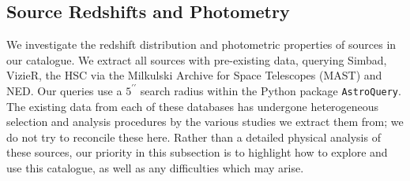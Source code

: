 {\begin{table}
\centering
\caption{A breakdown of gems found in the visual inspection stage of contamination. Each gem category has been classified based on the references associated with each object.} 
\label{tab:gems}
\end{table}


\vspace{-5mm}

\subsection{Source Redshifts and Photometry}\label{z_phot_analysis}
\noindent We investigate the redshift distribution and photometric properties of sources in our catalogue. We extract all sources with pre-existing data, querying Simbad, VizieR, the HSC via the Milkulski Archive for Space Telescopes (MAST) and NED. Our queries use a $5^{\prime \prime}$ search radius within the Python package \texttt{AstroQuery}. The existing data from each of these databases has undergone heterogeneous selection and analysis procedures by the various studies we extract them from; we do not try to reconcile these here. Rather than a detailed physical analysis of these sources, our priority in this subsection is to highlight how to explore and use this catalogue, as well as any difficulties which may arise.

}
